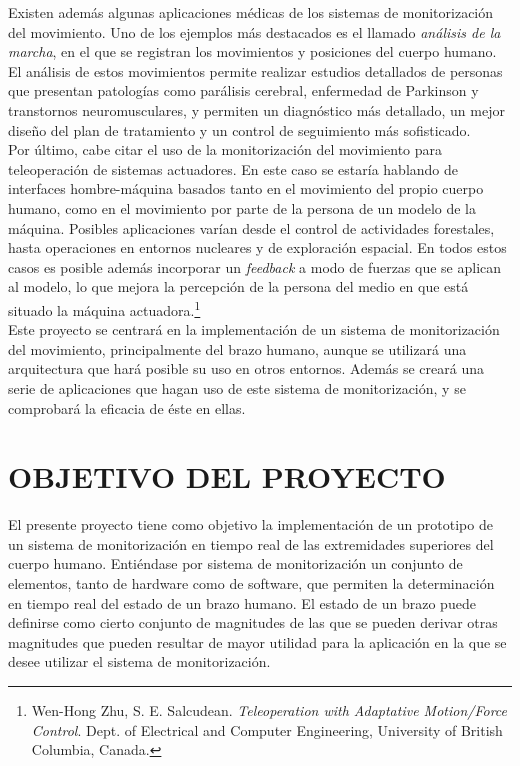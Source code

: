 \documentclass[12pt, a4paper]{report}
\begin{document}
Existen además algunas aplicaciones médicas de los sistemas de monitorización del movimiento. Uno de los ejemplos más destacados es el llamado \textit{análisis de la marcha}, en el que se registran los movimientos y posiciones del cuerpo humano. El análisis de estos movimientos permite realizar estudios detallados de personas que presentan patologías como parálisis cerebral, enfermedad de Parkinson y transtornos neuromusculares, y permiten un diagnóstico más detallado, un mejor diseño del plan de tratamiento y un control de seguimiento más sofisticado. \\

Por último, cabe citar el uso de la monitorización del movimiento para teleoperación de sistemas actuadores. En este caso se estaría hablando de interfaces hombre-máquina basados tanto en el movimiento del propio cuerpo humano, como en el movimiento por parte de la persona de un modelo de la máquina. Posibles aplicaciones varían desde el control de actividades forestales, hasta operaciones en entornos nucleares y de exploración espacial. En todos estos casos es posible además incorporar un \textit{feedback} a modo de fuerzas que se aplican al modelo, lo que mejora la percepción de la persona del medio en que está situado la máquina actuadora.\footnote{Wen-Hong Zhu, S. E. Salcudean. \textit{Teleoperation with Adaptative Motion/Force Control}. Dept. of Electrical and Computer Engineering, University of British Columbia, Canada.}\\

Este proyecto se centrará en la implementación de un sistema de monitorización del movimiento, principalmente del brazo humano, aunque se utilizará una arquitectura que hará posible su uso en otros entornos. Además se creará una serie de aplicaciones que hagan uso de este sistema de monitorización, y se comprobará la eficacia de éste en ellas.


\chapter{OBJETIVO DEL PROYECTO}

El presente proyecto tiene como objetivo la implementación de un prototipo de un sistema de monitorización en tiempo real de las extremidades superiores del cuerpo humano. Entiéndase por sistema de monitorización un conjunto de elementos, tanto de hardware como de software, que permiten la determinación en tiempo real del estado de un brazo humano. El estado de un brazo puede definirse como cierto conjunto de magnitudes de las que se pueden derivar otras magnitudes que pueden resultar de mayor utilidad para la aplicación en la que se desee utilizar el sistema de monitorización. \\
\end{document}
